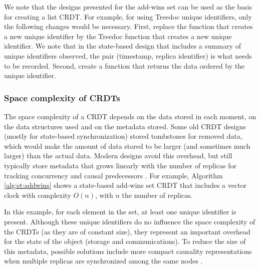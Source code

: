 \documentclass[12pt]{article}
\begin{document}
We note that the designs presented for the add-wins set can be used as the basis
for creating a list CRDT. 
For example, for using Treedoc unique identifiers, only the following changes would 
be necessary.
First, replace the function that creates a new unique identifier by the Treedoc function 
that creates a new unique identifier.
We note that in the state-based design that includes a summary of unique identifiers 
observed, the pair (timestamp, replica identifier) is what needs to be recorded.
Second, create a function that returns the data ordered by the unique identifier.


%
%
%
%
%
%
%
\subsubsection{Space complexity of CRDTs}
The space complexity of a CRDT depends on the data stored in each moment, 
on the data structures used and on the metadata stored. 
Some old CRDT designs (mostly for state-based synchronization) stored tombstones 
for removed data, which would make the amount of data stored to be larger 
(and sometimes much larger) than the actual data. Modern designs avoid
this overhead, but still typically store metadata that grows linearly 
with the number of replicas  for tracking concurrency and causal 
predecessors \cite{DBLP:journals/ipl/Charron-Bost91}.
For example, Algorithm \ref{alg:st:addwins} shows a state-based add-wins
set CRDT that includes a vector clock with complexity $O(n)$, 
with $n$ the number of replicas.

In this example, for each element in the set, at least one unique identifier is
present.
Although these unique identifiers do no influence the space complexity of the 
CRDTs (as they are of constant size), they represent an important overhead 
for the state of the object (storage and communications). 
To reduce the size of this metadata, possible solutions include 
more compact causality representations when multiple replicas are 
synchronized among the same nodes 
\cite{DBLP:journals/dc/MalkhiT07,swiftcloud,DBLP:conf/srds/GoncalvesABF17,DBLP:journals/corr/AlmeidaB13}. 
\end{document}
